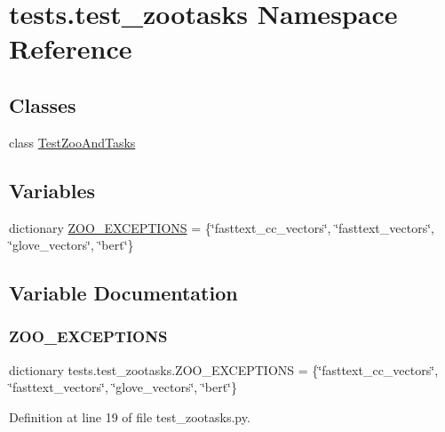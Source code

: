 \hypertarget{namespacetests_1_1test__zootasks}{}\section{tests.\+test\+\_\+zootasks Namespace Reference}
\label{namespacetests_1_1test__zootasks}
\subsection*{Classes}
\begin{DoxyCompactItemize}
\item 
class \hyperlink{classtests_1_1test__zootasks_1_1TestZooAndTasks}{Test\+Zoo\+And\+Tasks}
\end{DoxyCompactItemize}
\subsection*{Variables}
\begin{DoxyCompactItemize}
\item 
dictionary \hyperlink{namespacetests_1_1test__zootasks_a4178d1014bc80c2a09c583572fa539ed}{Z\+O\+O\+\_\+\+E\+X\+C\+E\+P\+T\+I\+O\+NS} = \{\char`\"{}fasttext\+\_\+cc\+\_\+vectors\char`\"{}, \char`\"{}fasttext\+\_\+vectors\char`\"{}, \char`\"{}glove\+\_\+vectors\char`\"{}, \char`\"{}bert\char`\"{}\}
\end{DoxyCompactItemize}


\subsection{Variable Documentation}
\mbox{\label{namespacetests_1_1test__zootasks_a4178d1014bc80c2a09c583572fa539ed}} 
\subsubsection{\texorpdfstring{Z\+O\+O\+\_\+\+E\+X\+C\+E\+P\+T\+I\+O\+NS}{ZOO\_EXCEPTIONS}}
{\footnotesize\ttfamily dictionary tests.\+test\+\_\+zootasks.\+Z\+O\+O\+\_\+\+E\+X\+C\+E\+P\+T\+I\+O\+NS = \{\char`\"{}fasttext\+\_\+cc\+\_\+vectors\char`\"{}, \char`\"{}fasttext\+\_\+vectors\char`\"{}, \char`\"{}glove\+\_\+vectors\char`\"{}, \char`\"{}bert\char`\"{}\}}



Definition at line 19 of file test\+\_\+zootasks.\+py.

